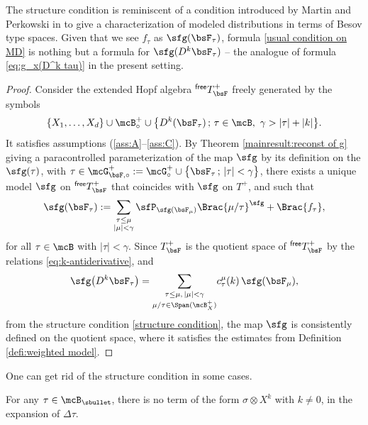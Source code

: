 The structure condition is reminiscent of a condition introduced by Martin and Perkowski in \cite{MP18} to give a characterization of modeled distributions in terms of Besov type spaces. Given that we see $f_\tau$ as $\sfg({\bsF}_\tau)$, formula \eqref{usual condition on MD} is nothing but a formula for ${\sfg}(D^k{\bsF}_\tau)$ -- the analogue of formula \eqref{eq:g_x(D^k tau)} in the present setting.

\begin{proof}
Consider the extended Hopf algebra $^\textsf{free}T_{\bsF}^+$ freely generated by the symbols
\[
\{X_1,\dots,X_d\}\cup\mcB_\circ^+\cup\big\{D^k(\bsF_\tau)\,;\, \tau\in\mcB,\ \gamma>|\tau|+|k|\big\}.
\]
It satisfies assumptions (\ref{ass:A}--\ref{ass:C}).
By Theorem \ref{mainresult:reconst of g} giving a paracontrolled parameterization of the map $\sfg$ by its definition on the $\sfg(\tau)$, with $\tau\in\mcG^+_{\bsF,\circ} := \mcG^+_\circ\cup\big\{{\bsF}_\tau\,;\,\vert\tau\vert<\gamma\big\}$, there exists a unique model $\sfg$ on $^\textsf{free}T_{\bsF}^+$ that coincides with $\sfg$ on $T^+$, and such that
\[
\sfg(\bsF_\tau) := \sum_{\substack{\tau\le\mu\\|\mu|<\gamma}}\sfP_{\sfg(\bsF_\mu)}\Brac{\mu/\tau}^{\sfg} + \Brac{f_\tau},
\]
for all $\tau\in\mcB$ with $\vert\tau\vert<\gamma$. Since $T_{\bsF}^+$ is the quotient space of $^\textsf{free}T_{\bsF}^+$ by the relations \eqref{eq:k-antiderivative}, and
\[
\sfg\bigl(D^k\bsF_\tau\bigr) = \underset{\mu/\tau\in\Span (\mcB_X^+)}{\sum_{\tau\leq\mu, \,|\mu|<\gamma}} c_\tau^\mu(k)\,\sfg(\bsF_\mu),
\]
from the structure condition \eqref{structure condition}, the map $\sfg$ is consistently defined on the quotient space, where it satisfies the estimates from Definition \ref{defi:weighted model}.
\end{proof}

One can get rid of the structure condition in some cases.

\begin{assumption}\label{ass:D}
For any $\tau\in\mcB_\sbullet$, there is no term of the form $\sigma\otimes X^k$ with $k\neq0$, in the expansion of $\Delta\tau$.
\end{assumption}

